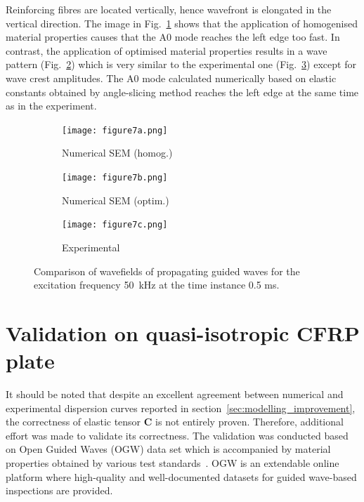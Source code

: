\documentclass[preprint,12pt]{elsarticle}
\newcommand{\matr}[1]{\mathbf{#1}} %
\begin{document}
Reinforcing fibres are located vertically, hence wavefront is elongated in the vertical direction.
The image in Fig.~\ref{fig:wavefield_sem_homog} shows that the application of homogenised material properties causes that the A0 mode reaches the left edge too fast. 
In contrast, the application of optimised material properties results in a wave pattern (Fig.~\ref{fig:wavefield_sem_opt}) which is very similar to the experimental one (Fig.~\ref{fig:wavefield_exp}) except for wave crest amplitudes. 
The A0 mode calculated numerically based on elastic constants obtained by angle-slicing method reaches the left edge at the same time as in the experiment.
\begin{figure} [h!]
	\centering
	\begin{subfigure}[t]{0.32\textwidth}
		\centering
		\texttt{[image: figure7a.png]}
		\caption{Numerical SEM (homog.)}
		\label{fig:wavefield_sem_homog}
	\end{subfigure}
	\hfill
	\begin{subfigure}[t]{0.32\textwidth}
		\centering
		\texttt{[image: figure7b.png]}
		\caption{Numerical SEM (optim.)}
		\label{fig:wavefield_sem_opt}
	\end{subfigure}
	\hfill
	\begin{subfigure}[t]{0.32\textwidth}
		\centering
		\texttt{[image: figure7c.png]}
		\caption{Experimental}
		\label{fig:wavefield_exp}
	\end{subfigure}
	\caption{Comparison of wavefields of propagating guided waves for the excitation frequency 50~kHz at the time instance 0.5 ms.}
	\label{fig:wavefield_comparison}
\end{figure}
\clearpage
\section{Validation on quasi-isotropic CFRP plate\label{sec:validation}}
It should be noted that despite an excellent agreement between numerical and experimental dispersion curves reported in section~\ref{sec:modelling_improvement}, the correctness of elastic tensor $\matr{C}$ is not entirely proven.
Therefore, additional effort was made to validate its correctness.
The validation was conducted based on Open Guided Waves (OGW) data set which is accompanied by material properties obtained by various test standards~\cite{Moll2019}.
OGW is an extendable online platform where high-quality and well-documented datasets for guided wave-based inspections are provided.
\end{document}
